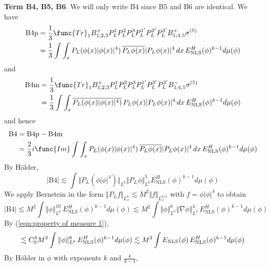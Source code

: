\documentclass[12pt,letterpaper,leqno]{amsart}
\theoremstyle{plain}
\numberwithin{equation}{section}
\numberwithin{theorem}{section}
\numberwithin{proposition}{section}
\numberwithin{lemma}{section}
\numberwithin{corollary}{section}
\begin{document}
\noindent \textbf{Term B4, B5, B6}. We will only write B4 since B5 and B6
are identical. We have 
\begin{align*}
\text{B4p}& =\frac{1}{3}\func{Tr}%
_{1}B_{1;2,3}^{+}P_{L}^{1}P_{L}^{2}P_{L}^{3}P_{L}^{1^{\prime
}}P_{L}^{2^{\prime }}P_{L}^{3^{\prime }}B_{1;4,5}^{+}\sigma ^{(5)} \\
& =\frac{1}{3}\int \int_{x}P_{L}(\phi (x)|\phi (x)|^{4})\,\overline{%
P_{L}\phi (x)}|P_{L}\phi (x)|^{4}\,dx\,E_{\text{NLS}}^{H}(\phi )^{k-1}d\mu
(\phi )
\end{align*}%
and 
\begin{align*}
\text{B4m}& =\frac{1}{3}\func{Tr}%
_{1}B_{1;2,3}^{+}P_{L}^{1}P_{L}^{2}P_{L}^{3}P_{L}^{1^{\prime
}}P_{L}^{2^{\prime }}P_{L}^{3^{\prime }}B_{1;4,5}^{-}\sigma ^{(5)} \\
& =\frac{1}{3}\int \int_{x}\overline{P_{L}(\phi (x)|\phi (x)|^{4})}%
\,P_{L}\phi (x)|P_{L}\phi (x)|^{4}\,dx\,E_{\text{NLS}}^{H}(\phi )^{k-1}d\mu
(\phi )
\end{align*}%
and hence 
\begin{align*}
\text{B4}& =\text{B4p}-\text{B4m} \\
& =\frac{2}{3}i\func{Im}\int \int_{x}P_{L}(\phi (x)|\phi (x)|^{4})\,%
\overline{P_{L}\phi (x)}|P_{L}\phi (x)|^{4}\,dx\,E_{\text{NLS}}^{H}(\phi
)^{k-1}d\mu (\phi )
\end{align*}%
By H\"{o}lder, 
\begin{equation*}
\left\vert \text{B4}\right\vert \lesssim \int \Vert P_{L}(\phi |\phi
|^{4})\Vert _{L^{6}}\Vert P_{L}\phi \Vert _{L^{6}}^{5}E_{\text{NLS}%
}^{H}(\phi )^{k-1}d\mu (\phi )
\end{equation*}%
We apply Bernstein in the form $\Vert P_{L}f\Vert _{L_{x}^{6}}\lesssim
M^{2}\Vert f\Vert _{L_{x}^{6/5}}$ with $f=\phi |\phi |^{4}$ to obtain 
\begin{equation*}
\left\vert \text{B4}\right\vert \lesssim M^{2}\int \Vert \phi \Vert
_{L^{6}}^{10}\,E_{\text{NLS}}^{H}(\phi )^{k-1}d\mu (\phi )\lesssim M^{2}\int
\Vert \phi \Vert _{L^{6}}^{6}\left\Vert \nabla \phi \right\Vert
_{L^{2}}^{4}\,E_{\text{NLS}}^{H}(\phi )^{k-1}d\mu (\phi )
\end{equation*}%
By (\ref{eqn:property of measure 1}),%
\begin{equation*}
\lesssim C_{0}^{4}M^{2}\int \Vert \phi \Vert _{L^{6}}^{6}\,E_{\text{NLS}%
}^{H}(\phi )^{k-1}d\mu (\phi )\lesssim M^{2}\int E_{\text{NLS}}(\phi )\,E_{%
\text{NLS}}^{H}(\phi )^{k-1}d\mu (\phi )
\end{equation*}%
By H\"{o}lder in $\phi $ with exponents $k$ and $\frac{k}{k-1}$, 
\end{document}
